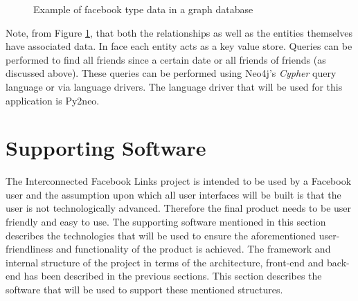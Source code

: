 \documentclass[10pt,onecolumn]{article}
\begin{document}
\begin{figure}[htbp]
    \centering
    \caption{Example of facebook type data in a graph database}
    \label{friends}
\end{figure}
Note, from Figure \ref{friends}, that both the relationships as well as the entities themselves have associated data. In face each entity acts as a key value store. Queries can be performed to find all friends since a certain date or all friends of friends (as discussed above). These queries can be performed using Neo4j's \emph{Cypher} query language or via language drivers. The language driver that will be used for this application is Py2neo.

\section{Supporting Software}
The Interconnected Facebook Links project is intended to be used by a Facebook user and the assumption upon which all user interfaces will be built is that the user is not technologically advanced. Therefore the final product needs to be user friendly and easy to use. The supporting software mentioned in this section describes the technologies that will be used to ensure the aforementioned user-friendliness and functionality of the product is achieved. The framework and internal structure  of the project in terms of the architecture, front-end and back-end has been described in the previous sections. This section describes the software that will be used to support these mentioned structures.
\end{document}
